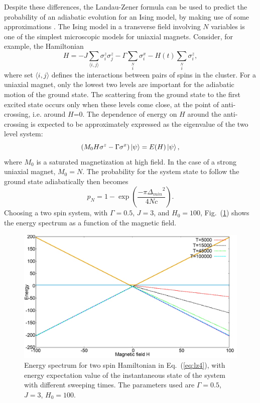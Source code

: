 \documentclass[../main.tex]{subfiles}
\begin{document}
Despite these differences, the Landau-Zener formula can be used to predict the probability of an adiabatic evolution for an Ising model, by making use of some approximations \cite{miyashita1996observation}. The Ising model in a transverse field involving $N$ variables is one of the simplest microscopic models for uniaxial magnets. Consider, for example, the Hamiltonian
\begin{equation}
H=-J \sum \limits_{\langle i,j\rangle} \sigma_i^z \sigma_j^z - \Gamma \sum \limits_i \limits^N \sigma_i^x -H(t) \sum \limits_i \limits^N\sigma_i^z, \label{eq:lz4}
\end{equation} 
where set $\langle i,j \rangle$ defines the interactions between pairs of spins in the cluster. For a uniaxial magnet, only the lowest two levels are important for the adiabatic motion of the ground state. The scattering from the ground state to the first excited state occurs only when these levels come close, at the point of anti-crossing, i.e. around $H$=0. The dependence of energy on $H$ around the anti-crossing is expected to be approximately expressed  as the eigenvalue of the two level system:
\begin{equation}
(M_0H\sigma^z-\Gamma \sigma^x)\ket{\psi}=E(H)\ket{\psi}, \label{eq:lz6}
\end{equation}
where $M_0$ is a saturated magnetization at high field. In the case of a strong uniaxial magnet, $M_0=N$. The probability for the system state to follow the ground state adiabatically then becomes
\begin{equation}
p_N=1-\exp(\frac{-\pi {\Delta_{min}}^2}{4Nc}). \label{eq:lz5}
\end{equation}
Choosing a two spin system, with $\Gamma=0.5$, $J=3$, and $H_0=100$, Fig.~(\ref{fig:lz4}) shows the energy spectrum as a function of the magnetic field.
\begin{figure}[H]
\centering 
\includegraphics[scale=0.24]{EnergySpectrum_H100.png}
\caption{Energy spectrum for two spin Hamiltonian in Eq.~(\ref{eq:lz4}), with energy expectation value of the instantaneous state of the system with different sweeping times. The parameters used are $\Gamma=0.5$, $J=3$, $H_0=100$.}
\label{fig:lz4}
\end{figure}
\end{document}
